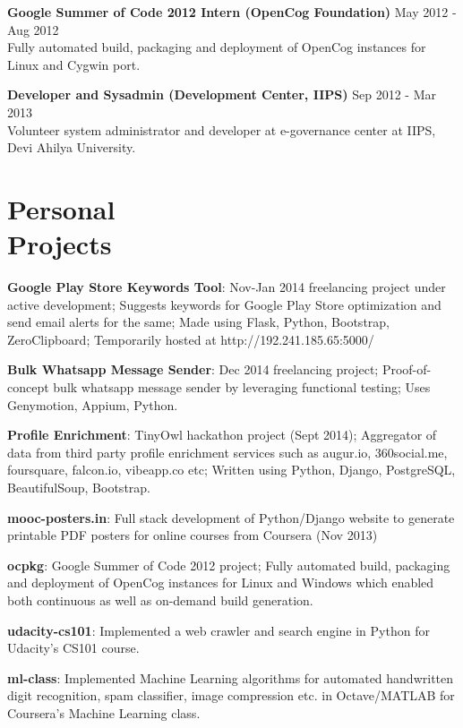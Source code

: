 \documentclass[margin,line]{resume}
\begin{document}
\begin{resume}
\begin{list2}
	\item \textbf{Google Summer of Code 2012 Intern (OpenCog Foundation)} \hspace{18mm} May 2012 - Aug 2012 \\ Fully automated build, packaging and deployment of OpenCog instances for Linux and Cygwin port.

	\item \textbf{Developer and Sysadmin (Development Center, IIPS)} \hspace{30mm} Sep 2012 - Mar 2013 \\ Volunteer system administrator and developer at e-governance center at IIPS, Devi Ahilya University.

	\end{list2}

    \section{\mysidestyle Personal \\ Projects} 
	\begin{list2}

	\item \textbf{Google Play Store Keywords Tool}: Nov-Jan 2014 freelancing project under active development; Suggests keywords for Google Play Store optimization and send email alerts for the same; Made using Flask, Python, Bootstrap, ZeroClipboard; Temporarily hosted at http://192.241.185.65:5000/
	\item \textbf{Bulk Whatsapp Message Sender}: Dec 2014 freelancing project; Proof-of-concept bulk whatsapp message sender by leveraging functional testing; Uses Genymotion, Appium, Python.
	\item \textbf{Profile Enrichment}: TinyOwl hackathon project (Sept 2014); Aggregator of data from third party profile enrichment services such as augur.io, 360social.me, foursquare, falcon.io, vibeapp.co etc; Written using Python, Django, PostgreSQL, BeautifulSoup, Bootstrap.
	\item \textbf{mooc-posters.in}: Full stack development of Python/Django website to generate printable PDF posters for online courses from Coursera (Nov 2013)
	\item \textbf{ocpkg}: Google Summer of Code 2012 project; Fully automated build, packaging and deployment of OpenCog instances for Linux and Windows which enabled both continuous as well as on-demand build generation.
	\item \textbf{udacity-cs101}: Implemented a web crawler and search engine in Python for Udacity's CS101 course.
	\item \textbf{ml-class}: Implemented Machine Learning algorithms for automated handwritten digit recognition, spam classifier, image compression etc. in Octave/MATLAB for Coursera's Machine Learning class.
    \end{list2}


\end{resume}
\end{document}
